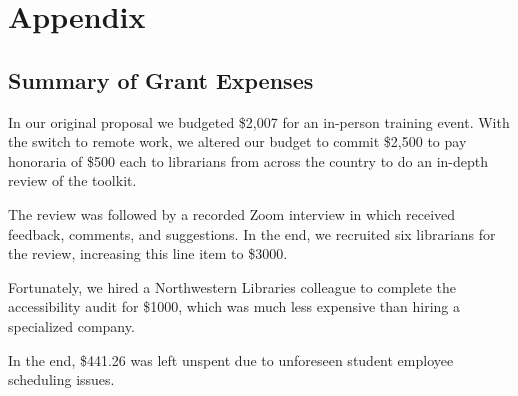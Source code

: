 \documentclass[
  11pt,
  openany]{book}
\begin{document}
\hypertarget{appendix}{%
\chapter{Appendix}\label{appendix}}

\hypertarget{summary-of-grant-expenses}{%
\section{Summary of Grant Expenses}\label{summary-of-grant-expenses}}

In our original proposal we budgeted \$2,007 for an in-person training event.
With the switch to remote work, we altered our budget to commit \$2,500 to pay
honoraria of \$500 each to librarians from across the country to do an
in-depth review of the toolkit.

The review was followed by a recorded Zoom interview in which received
feedback, comments, and suggestions. In the end, we recruited six librarians
for the review, increasing this line item to \$3000.

Fortunately, we hired a Northwestern Libraries colleague to complete the
accessibility audit for \$1000, which was much less expensive than hiring a
specialized company.

In the end, \$441.26 was left unspent due to unforeseen student employee
scheduling issues.
\end{document}
